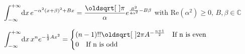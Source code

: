 \begin{squishlist}
    \item $\displaystyle{\int_{-\infty}^{+\infty}} \ud x \, e^{-\alpha^2(x+\beta)^2 + Bx} = \dfrac{\sqrt{\pi}}{\alpha} \displaystyle{e^{\frac{B^2}{4\alpha^2}-B\beta}} $ with Re$(\alpha^2) \ge 0, \, B, \beta \in \mathbb{C}$ 
    
    \item $      \displaystyle{\int_{-\infty}^{+\infty}} \ud x \, x^n e^{-\frac{1}{2}Ax^2} = 
    \begin{cases}
    (n-1)!!\sqrt{2\pi}A^{-\frac{n+1}{2}} \quad \text{If n is even} \\
    0 \quad \text{If n is odd}
    \end{cases}
    $
\end{squishlist}


\columnbreak



